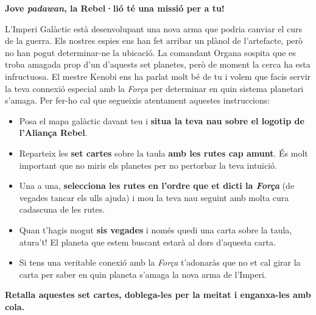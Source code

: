\documentclass[a4paper, 10pt]{article}
\makeatletter
\newcommand{\globalcolor}[1]{\color{#1}\global\let\default@color\current@color}
\makeatother
\begin{document}
    {\large \begin{center}{\Large \textbf{Jove \emph{padawan}, la Rebel·lió té una missió per a tu!}}\end{center}

    L'Imperi Galàctic està desenvolupant una nova arma que podria canviar el curs de la guerra. Els nostres espies ens han fet arribar un plànol de l'artefacte, però no han pogut determinar-ne la ubicació. La comandant Organa sospita que es troba amagada prop d'un d'aquests set planetes, però de moment la cerca ha esta infructuosa. El mestre Kenobi ens ha parlat molt bé de tu i volem que facis servir la teva connexió especial amb la \emph{Força} per determinar en quin sistema planetari s'amaga. Per fer-ho cal que segueixis atentament aquestes instruccions:

    \begin{itemize}
        \item Posa el mapa galàctic davant teu i \textbf{situa la teva nau sobre el logotip de l'Aliança Rebel}.
        \item Reparteix les \textbf{set cartes} sobre la taula \textbf{amb les rutes cap amunt}. És molt important que no miris els planetes per no pertorbar la teva intuició.
        \item Una a una, \textbf{selecciona les rutes en l'ordre que et dicti la \emph{Força}} (de vegades tancar els ulls ajuda) i mou la teva nau seguint amb molta cura cadascuna de les rutes.
        \item Quan t'hagis mogut \textbf{sis vegades} i només quedi una carta sobre la taula, atura't! El planeta que estem buscant estarà al dors d'aquesta carta.
        \item Si tens una veritable conexió amb la \emph{Força} t'adonaràs que no et cal girar la carta per saber en quin planeta s'amaga la nova arma de l'Imperi.
    \end{itemize}}


    \newpage
    \thispagestyle{empty}
    \globalcolor{white}  
    \pagecolor{black}
    
    \begin{center}
        {\Large \textbf{Retalla aquestes set cartes, doblega-les per la meitat i enganxa-les amb cola.}}
    \end{center}

    \bigskip\bigskip
\end{document}

